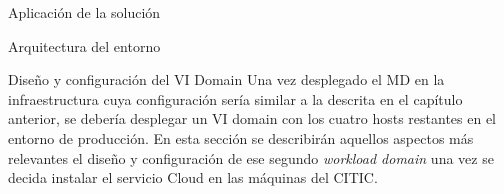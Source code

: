 \begin{chapter}{Aplicación de la solución}
\begin{section}{Arquitectura del entorno}
\begin{subsection}{Diseño y configuración del VI Domain}
    Una vez desplegado el MD en la infraestructura cuya configuración sería similar a la descrita en el capítulo anterior, se debería desplegar un VI domain con los cuatro hosts restantes en el entorno de producción. En esta sección se describirán aquellos aspectos más relevantes el diseño y configuración de ese segundo \textit{workload domain} una vez se decida instalar el servicio Cloud en las máquinas del CITIC.


\end{subsection}


\end{section}

\end{chapter}
